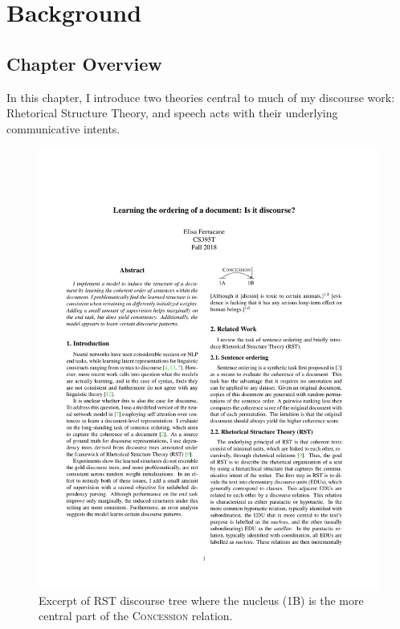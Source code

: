 \chapter{Background}
\label{ch:background}

\section{Chapter Overview}
In this chapter, I introduce two theories central to much of my discourse work: Rhetorical Structure Theory, and speech acts with their underlying communicative intents.

\begin{figure}
    \centering
    \includegraphics[scale=0.8]{plots/bkgrnd_rst_concession.pdf}
    \caption{Excerpt of RST discourse tree where the nucleus (1B) is the more central part of the \textsc{Concession} relation.}
    \label{fig:bkgrnd_rst_concession}
\end{figure}



